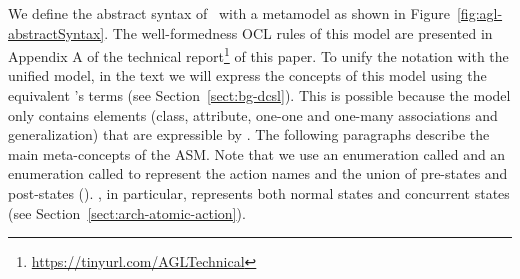 We define the abstract syntax of \agl~with a metamodel as shown in Figure~\ref{fig:agl-abstractSyntax}. The well-formedness OCL rules of this model are presented in Appendix A of the technical report\footnote{\url{https://tinyurl.com/AGLTechnical}} of this paper. %
To unify the notation with the unified model, in the text we will express the concepts of this model using the equivalent \dcsl's terms (see Section~\ref{sect:bg-dcsl}). This is possible because the model only contains elements (class, attribute, one-one and one-many associations and generalization) that are expressible by \dcsl.
%
The following paragraphs describe the main meta-concepts of the ASM. Note that we use an enumeration called  and an enumeration called  to represent the action names and the union of pre-states and post-states (\resp). , in particular, represents both normal states and concurrent states (see Section~\ref{sect:arch-atomic-action}).
%
